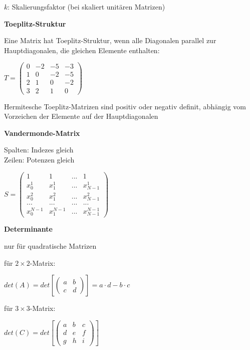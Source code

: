 $k$: Skalierungsfaktor (bei skaliert unitären Matrizen)

\textbf{Toeplitz-Struktur}

Eine Matrix hat Toeplitz-Struktur, wenn alle Diagonalen parallel zur Hauptdiagonalen, die gleichen Elemente enthalten:

$\displaystyle{
    T =
    \begin{pmatrix}
        0 & -2 & -5 & -3\\
        1 & 0 & -2 & -5 \\
        2 & 1 & 0 & -2  \\
        3 & 2 & 1 & 0
    \end{pmatrix}
}$
 
Hermitesche Toeplitz-Matrizen sind positiv oder negativ definit, abhängig vom Vorzeichen der
Elemente auf der Hauptdiagonalen

\textbf{Vandermonde-Matrix}

Spalten: Indezes gleich\\
Zeilen: Potenzen gleich

$\displaystyle{
    S =
    \begin{pmatrix}
        1 & 1 & ... & 1\\
        x_0^1 & x_1^1 & ... & x_{N-1}^1\\
        x_0^2 & x_1^2 & ... & x_{N-1}^2\\
        ... & ... & ... & ...\\
        x_0^{N-1} & x_1^{N-1} & ... & x_{N-1}^{N-1}
    \end{pmatrix}
}$

\textbf{Determinante}

nur für quadratische Matrizen

für $2 \times 2$-Matrix:

$\displaystyle{
    det(A) = det\left[
        \begin{pmatrix}
            a & b\\
            c & d
        \end{pmatrix}
    \right] = 
    a \cdot d - b\cdot c
}$

für $3 \times 3$-Matrix:

$\displaystyle{
    det(C) = det\left[
        \begin{pmatrix}
            a & b & c\\
            d & e & f\\
            g & h & i
        \end{pmatrix}
    \right]
}$

